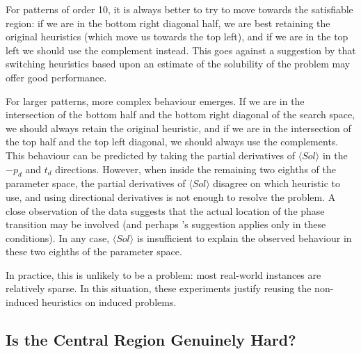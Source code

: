 \documentclass[twoside,11pt]{article}
\newcommand{\citet}[1]{\citeA{#1}}
\begin{document}
For patterns of order 10, it is always better to try to move towards the satisfiable region: if we
are in the bottom right diagonal half, we are best retaining the original heuristics (which move us
towards the top left), and if we are in the top left we should use the complement instead. This
goes against a suggestion by \citet{DBLP:conf/aaai/Walsh98} that switching heuristics based upon an estimate of
the solubility of the problem may offer good performance.

For larger patterns, more complex behaviour emerges. If we are in the intersection of the bottom half
and the bottom right diagonal of the search space, we should always retain the original heuristic,
and if we are in the intersection of the top half and the top left diagonal, we should always use
the complements. This behaviour can be predicted by taking the partial derivatives of $\langle Sol
\rangle$ in the $-p_d$ and $t_d$ directions.  However, when inside the remaining two eighths of the
parameter space, the partial derivatives of $\langle Sol \rangle$ disagree on which heuristic to
use, and using directional derivatives is not enough to resolve the problem. A close observation of
the data suggests that the actual location of the phase transition may be involved (and perhaps
\citeauthor{DBLP:conf/aaai/Walsh98}'s suggestion applies only in these conditions). In any case, $\langle Sol
\rangle$ is insufficient to explain the observed behaviour in these two eighths of the parameter space.

In practice, this is unlikely to be a problem: most real-world instances are relatively sparse. In
this situation, these experiments justify reusing the non-induced heuristics on induced problems.

\subsection{Is the Central Region Genuinely Hard?}
\end{document}
